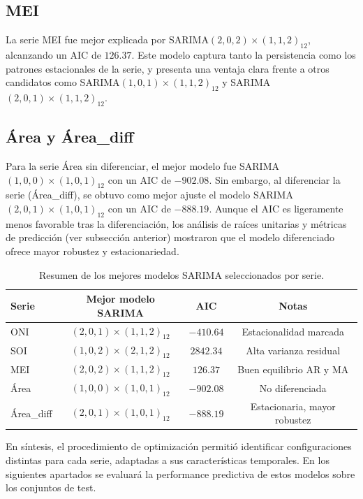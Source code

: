 \subsection{MEI}
La serie MEI fue mejor explicada por SARIMA$(2,0,2)\times(1,1,2)_{12}$, alcanzando un AIC de $126.37$. Este modelo captura tanto la persistencia como los patrones estacionales de la serie, y presenta una ventaja clara frente a otros candidatos como SARIMA$(1,0,1)\times(1,1,2)_{12}$ y SARIMA$(2,0,1)\times(1,1,2)_{12}$.

\subsection{Área y Área\_diff}
Para la serie Área sin diferenciar, el mejor modelo fue SARIMA$(1,0,0)\times(1,0,1)_{12}$ con un AIC de $-902.08$. Sin embargo, al diferenciar la serie (Área\_diff), se obtuvo como mejor ajuste el modelo SARIMA$(2,0,1)\times(1,0,1)_{12}$ con un AIC de $-888.19$. Aunque el AIC es ligeramente menos favorable tras la diferenciación, los análisis de raíces unitarias y métricas de predicción (ver subsección anterior) mostraron que el modelo diferenciado ofrece mayor robustez y estacionariedad.

\begin{table}[H]
    \centering
    \caption{Resumen de los mejores modelos SARIMA seleccionados por serie.}
    \begin{tabular}{lccc}
        \toprule
        \textbf{Serie} & \textbf{Mejor modelo SARIMA} & \textbf{AIC} & \textbf{Notas} \\
        \midrule
        ONI   & $(2,0,1)\times(1,1,2)_{12}$ & $-410.64$ & Estacionalidad marcada \\
        SOI   & $(1,0,2)\times(2,1,2)_{12}$ & $2842.34$ & Alta varianza residual \\
        MEI   & $(2,0,2)\times(1,1,2)_{12}$ & $126.37$  & Buen equilibrio AR y MA \\
        Área  & $(1,0,0)\times(1,0,1)_{12}$ & $-902.08$ & No diferenciada \\
        Área\_diff & $(2,0,1)\times(1,0,1)_{12}$ & $-888.19$ & Estacionaria, mayor robustez \\
        \bottomrule
    \end{tabular}
    \label{tab:sarima_modelos}
\end{table}

En síntesis, el procedimiento de optimización permitió identificar configuraciones distintas para cada serie, adaptadas a sus características temporales. En los siguientes apartados se evaluará la performance predictiva de estos modelos sobre los conjuntos de test.

